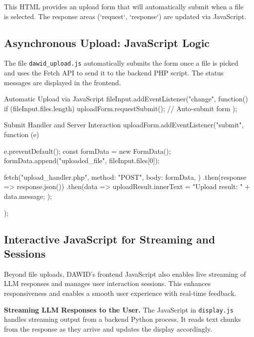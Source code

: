 This HTML provides an upload form that will automatically submit when a file is selected. The response areas (`request`, `response`) are updated via JavaScript.

%
\subsection*{Asynchronous Upload: JavaScript Logic}

The file \texttt{dawid\_upload.js} automatically submits the form once a file is picked and uses the Fetch API to send it to the backend PHP script. The status messages are displayed in the frontend.

\begin{codeonly}{Automatic Upload via JavaScript}
fileInput.addEventListener("change", function() {
    if (fileInput.files.length) {
        uploadForm.requestSubmit();  // Auto-submit form
    }
});
\end{codeonly}

\begin{codeonly}{Submit Handler and Server Interaction}
uploadForm.addEventListener("submit", function (e) {
    e.preventDefault();
    const formData = new FormData();
    formData.append("uploaded_file", fileInput.files[0]);

    fetch("upload_handler.php", {
        method: "POST",
        body: formData,
    })
    .then(response => response.json())
    .then(data => {
        uploadResult.innerText = "Upload result: " + data.message;
    });
});
\end{codeonly}

%
\subsection*{Interactive JavaScript for Streaming and Sessions}

Beyond file uploads, DAWID's frontend JavaScript also enables live streaming of LLM responses and manages user interaction sessions. This enhances responsiveness and enables a smooth user experience with real-time feedback.

%
{\bf Streaming LLM Responses to the User.} The JavaScript in \texttt{display.js} handles streaming output from a backend Python process. It reads text chunks from the response as they arrive and updates the display accordingly.

